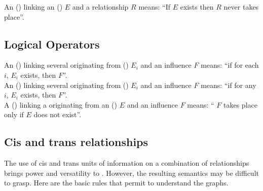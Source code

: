 \noindent
An  () linking an  () $E$ and a relationship $R$ means: ``If $E$ exists then $R$ never takes place''. 
\\[\baselineskip]

\subsection{Logical Operators}

An  () linking several  originating from  () $E_i$ and an influence $F$ means: ``if for each $i$, $E_i$ exists, then $F$''.\\[\baselineskip]

\noindent
An  () linking several  originating from  () $E_i$ and an influence $F$ means: ``if for any $i$, $E_i$ exists, then $F$''.\\[\baselineskip]

\noindent
A  () linking a  originating from an  () $E$ and an influence $F$ means: `` $F$ takes place only if $E$ does not exist''.\\[\baselineskip]


\subsection{Cis and trans relationships}\label{sec:cis-trans-semantics}

The use of cis and trans units of information on a combination of relationships brings power and versatility to \ERs. However, the resulting semantics may be difficult to grasp. Here are the basic rules that permit to understand the graphs.

